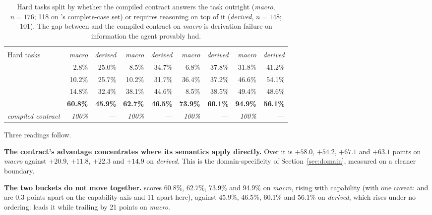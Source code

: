 \begin{table}[t]
\centering
\small
\setlength{\tabcolsep}{4pt}
\begin{tabular}{@{}lrrrrrrrr@{}}
\toprule
& \multicolumn{2}{c}{\mGLM{}} & \multicolumn{2}{c}{\mDS{}} & \multicolumn{2}{c}{\mSON{}} & \multicolumn{2}{c}{\mGPT{}} \\
\cmidrule(lr){2-3}\cmidrule(lr){4-5}\cmidrule(lr){6-7}\cmidrule(lr){8-9}
Hard tasks & \emph{macro} & \emph{derived} & \emph{macro} & \emph{derived} & \emph{macro} & \emph{derived} & \emph{macro} & \emph{derived} \\
\midrule
\armS{} & 2.8\% & 25.0\% & 8.5\% & 34.7\% & 6.8\% & 37.8\% & 31.8\% & 41.2\% \\
\armH{} & 10.2\% & 25.7\% & 10.2\% & 31.7\% & 36.4\% & 37.2\% & 46.6\% & 54.1\% \\
\armM{} & 14.8\% & 32.4\% & 38.1\% & 44.6\% & 8.5\% & 38.5\% & 49.4\% & 48.6\% \\
\armC{} & \textbf{60.8\%} & \textbf{45.9\%} & \textbf{62.7\%} & \textbf{46.5\%} & \textbf{73.9\%} & \textbf{60.1\%} & \textbf{94.9\%} & \textbf{56.1\%} \\
\midrule
\emph{compiled contract} & \emph{100\%} & --- & \emph{100\%} & --- & \emph{100\%} & --- & \emph{100\%} & --- \\
\bottomrule
\end{tabular}
\caption{Hard tasks split by whether the compiled contract answers the task
outright (\emph{macro}, $n{=}176$; 118 on \mDS{}'s complete-case set) or
requires reasoning on top of it (\emph{derived}, $n{=}148$; 101). The gap
between \armC{} and the compiled contract on \emph{macro} is derivation
failure on information the agent provably had.}
\label{tab:buckets}
\end{table}

Three readings follow.

\textbf{The contract's advantage concentrates where its semantics apply
directly.} Over \armS{} it is $+58.0$, $+54.2$, $+67.1$ and $+63.1$ points on
\emph{macro} against $+20.9$, $+11.8$, $+22.3$ and $+14.9$ on \emph{derived}.
This is the domain-specificity of Section~\ref{sec:domain}, measured on a
cleaner boundary.

\textbf{The two buckets do not move together.} \armC{} scores 60.8\%, 62.7\%,
73.9\% and 94.9\% on \emph{macro}, rising with capability (with one caveat:
\mDS{} and \mSON{} are 0.3 points apart on the capability axis and 11 apart
here), against 45.9\%, 46.5\%, 60.1\% and 56.1\% on \emph{derived}, which
rises under no ordering: \mSON{} leads it while trailing \mGPT{} by 21
points on \emph{macro}.

